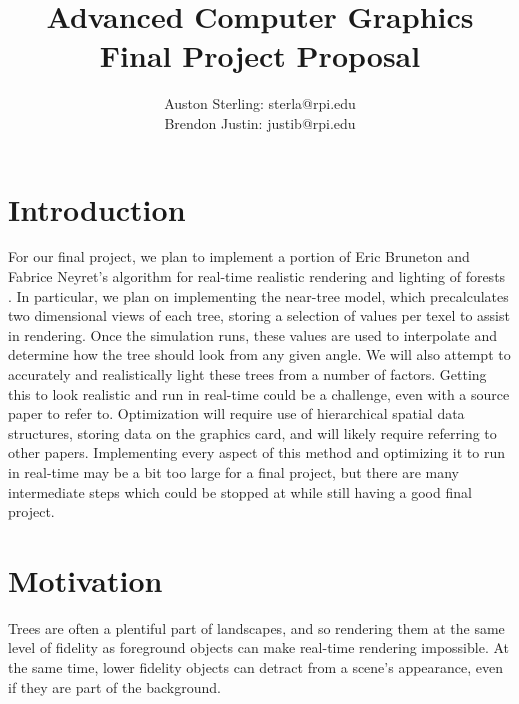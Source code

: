 \documentclass{article}
\begin{document}
\title{Advanced Computer Graphics Final Project Proposal}
\author{Auston Sterling: sterla@rpi.edu \\ Brendon Justin: justib@rpi.edu}
\date{}
\maketitle

\section{Introduction}
For our final project, we plan to implement a portion of Eric Bruneton and Fabrice Neyret's algorithm for real-time realistic rendering and lighting of forests \cite{trees}. In particular, we plan on implementing the near-tree model, which precalculates two dimensional views of each tree, storing a selection of values per texel to assist in rendering. Once the simulation runs, these values are used to interpolate and determine how the tree should look from any given angle. We will also attempt to accurately and realistically light these trees from a number of factors. Getting this to look realistic and run in real-time could be a challenge, even with a source paper to refer to. Optimization will require use of hierarchical spatial data structures, storing data on the graphics card, and will likely require referring to other papers. Implementing every aspect of this method and optimizing it to run in real-time may be a bit too large for a final project, but there are many intermediate steps which could be stopped at while still having a good final project.

\section{Motivation}
Trees are often a plentiful part of landscapes, and so rendering them at the same level of fidelity as foreground objects can make real-time rendering impossible.  At the same time, lower fidelity objects can detract from a scene's appearance, even if they are part of the background.  
\end{document}
